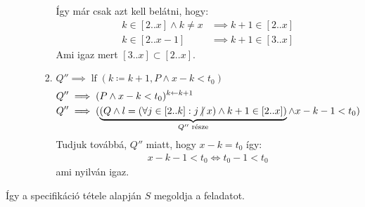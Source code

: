 \documentclass[a4paper,12pt]{article}
\theoremstyle{definition}
\DeclareMathOperator{\lf}{lf}
\begin{document}
\begin{solution}
\begin{enumerate}
\begin{enumerate}
\begin{enumerate}
					Így már csak azt kell belátni, hogy:
					\begin{align*}
						k \in [2..x] \land k \ne x &\implies k + 1 \in [2..x] \\
						k \in [2..x-1] & \implies k + 1 \in [3..x]
					\end{align*}
					Ami igaz mert $[3..x] \subset [2..x]$.
					\item $Q'' \implies \lf{(k \coloneq k+1, P \land x-k < t_0)} $
					\begin{align*}
						Q'' &\implies (P \land x - k < t_0)^{k \leftarrow k+1} \\
						Q'' &\implies  ( \underbrace{( Q \land l = \left( \forall j \in \left[ 2..k\right]: j \centernot{|} x \right) \land k+1 \in \left[ 2..x \right]  )}_{Q'' \text{ része}} \land x - k - 1 < t_0 )
					\end{align*}
					Tudjuk továbbá, $Q''$ miatt, hogy $x-k = t_0$ így:
					\begin{align*}
						x-k-1 < t_0 \iff t_0-1 < t_0
					\end{align*}
					ami nyilván igaz.
				\end{enumerate}
			\end{enumerate}
		\end{enumerate}
		Így a specifikáció tétele alapján $S$ megoldja a feladatot.
	\end{solution}
\end{document}
